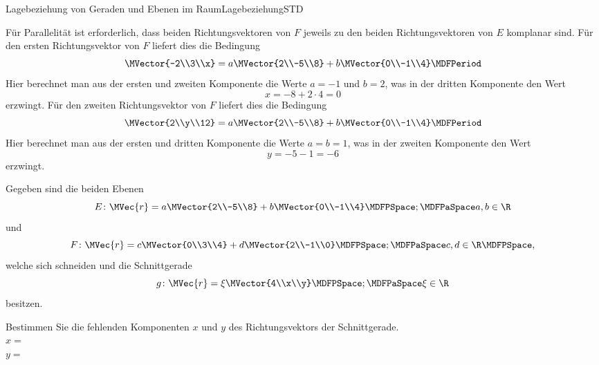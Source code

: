 \begin{MXContent}{Lagebeziehung von Geraden und Ebenen im Raum}{Lagebeziehung}{STD}
\begin{MExercise}
\begin{MHint}{\iSolution}
Für Parallelität ist erforderlich, dass beiden Richtungsvektoren von $F$ jeweils zu den beiden Richtungsvektoren von $E$ komplanar sind. Für den ersten Richtungsvektor von $F$ liefert dies die Bedingung
\[
 \MVector{-2\\3\\x}=a\MVector{2\\-5\\8}+b\MVector{0\\-1\\4} \MDFPeriod
\]
Hier berechnet man aus der ersten und zweiten Komponente die Werte $a=-1$ und $b=2$, was in der dritten Komponente den Wert
\[
 x=-8+2\cdot 4=0
\]
erzwingt. Für den zweiten Richtungsvektor von $F$ liefert dies die Bedingung
\[
 \MVector{2\\y\\12}=a\MVector{2\\-5\\8}+b\MVector{0\\-1\\4} \MDFPeriod
\]
Hier berechnet man aus der ersten und dritten Komponente die Werte $a=b=1$, was in der zweiten Komponente den Wert
\[
 y=-5-1=-6
\]
erzwingt. 
\end{MHint}


\end{MExercise}

\begin{MExercise}
Gegeben sind die beiden Ebenen 
\[
 E\colon\MVec{r}=a\MVector{2\\-5\\8}+b\MVector{0\\-1\\4}\MDFPSpace;\MDFPaSpace a,b\in\R
\]
und
\[
 F\colon\MVec{r}=c\MVector{0\\3\\4}+d\MVector{2\\-1\\0}\MDFPSpace;\MDFPaSpace c,d\in\R\MDFPSpace,
\]
welche sich schneiden und die Schnittgerade
\[
 g\colon\MVec{r}=\xi\MVector{4\\x\\y}\MDFPSpace;\MDFPaSpace \xi\in\R
\]
besitzen.

Bestimmen Sie die fehlenden Komponenten $x$ und $y$ des Richtungsvektors der Schnittgerade.\\
$x=$\\
$y=$


\end{MExercise}
\end{MXContent}
